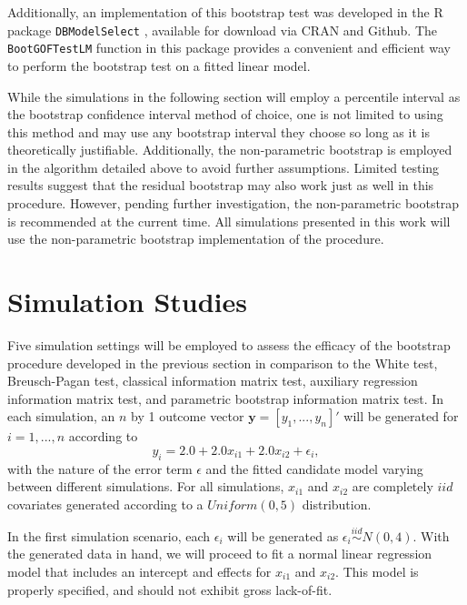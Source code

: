 \documentclass[review]{elsarticle}
\begin{document}
		Additionally, an implementation of this bootstrap test was developed in the R package \texttt{DBModelSelect} \citep{Koeneman}, available for download via CRAN and Github.
		The \texttt{BootGOFTestLM} function in this package provides a convenient and efficient way to perform the bootstrap test on a fitted linear model.
		
		While the simulations in the following section will employ a percentile interval as the bootstrap confidence interval method of choice, one is not limited to using this method
		and may use any bootstrap interval they choose so long as it is theoretically justifiable. Additionally, the non-parametric bootstrap is employed in the algorithm detailed above to avoid further
		assumptions. Limited testing results suggest that the residual bootstrap may also work just as well in this procedure. However, pending further investigation, the non-parametric
		bootstrap is recommended at the current time. All simulations presented in this work will use the non-parametric bootstrap implementation of the procedure.

\section{Simulation Studies}

Five simulation settings will be employed to assess the efficacy of the bootstrap procedure developed in the previous section in comparison to the White test, Breusch-Pagan test, classical information matrix test, auxiliary regression information matrix test, and parametric bootstrap information matrix test. In each simulation, an $n$ by 1 outcome vector $\bm{y} = [y_1,...,y_n]'$ will
be generated for $i = 1,...,n$ according to
\begin{equation*}
	y_i = 2.0 + 2.0 x_{i1} + 2.0 x_{i2} + \epsilon_i , 
\end{equation*}
with the nature of the error term $\epsilon$ and the fitted candidate model varying between different simulations. For all simulations, $x_{i1}$ and $x_{i2}$ are completely $iid$ covariates generated according to
a $Uniform(0,5)$ distribution.

In the first simulation scenario, each $\epsilon_i$ will be generated as $\epsilon_i \stackrel{iid}{\sim} N(0,4)$. With the generated data in hand, we will proceed to fit a normal linear regression model that includes an intercept and effects for $x_{i1}$ and $x_{i2}$. This model
is properly specified, and should not exhibit gross lack-of-fit.
\end{document}
